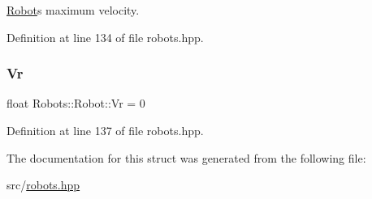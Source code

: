 \hyperlink{struct_robots_1_1_robot}{Robot}\textquotesingle{}s maximum velocity. 



Definition at line 134 of file robots.\+hpp.

\mbox{\label{struct_robots_1_1_robot_a7f9ac93eb83da8ea2dbb8a9aa75ad9f1}} 
\subsubsection{\texorpdfstring{Vr}{Vr}}
{\footnotesize\ttfamily float Robots\+::\+Robot\+::\+Vr = 0}



Definition at line 137 of file robots.\+hpp.



The documentation for this struct was generated from the following file\+:\begin{DoxyCompactItemize}
\item 
src/\hyperlink{robots_8hpp}{robots.\+hpp}\end{DoxyCompactItemize}
